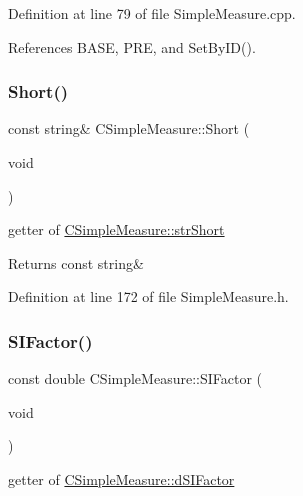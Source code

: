 Definition at line 79 of file Simple\+Measure.\+cpp.



References B\+A\+SE, P\+RE, and Set\+By\+I\+D().

\mbox{\label{classCSimpleMeasure_ab1e479ebf0d3a428ecd9f6b1daf3fe0c}} 
\subsubsection{\texorpdfstring{Short()}{Short()}}
{\footnotesize\ttfamily const string\& C\+Simple\+Measure\+::\+Short (\begin{DoxyParamCaption}\item[{void}]{ }\end{DoxyParamCaption})\hspace{0.3cm}{\ttfamily [inline]}}



getter of \hyperlink{classCSimpleMeasure_a39260e6516c163955c34dce6795292ad}{C\+Simple\+Measure\+::str\+Short} 

\begin{DoxyReturn}{Returns}
const string\& 
\end{DoxyReturn}


Definition at line 172 of file Simple\+Measure.\+h.

\mbox{\label{classCSimpleMeasure_ad9c08324e46ef4eee5695e7ea1d00018}} 
\subsubsection{\texorpdfstring{S\+I\+Factor()}{SIFactor()}}
{\footnotesize\ttfamily const double C\+Simple\+Measure\+::\+S\+I\+Factor (\begin{DoxyParamCaption}\item[{void}]{ }\end{DoxyParamCaption})\hspace{0.3cm}{\ttfamily [inline]}}



getter of \hyperlink{classCSimpleMeasure_a08be520f9d3a0e50cc63693f2fc607f2}{C\+Simple\+Measure\+::d\+S\+I\+Factor} 

